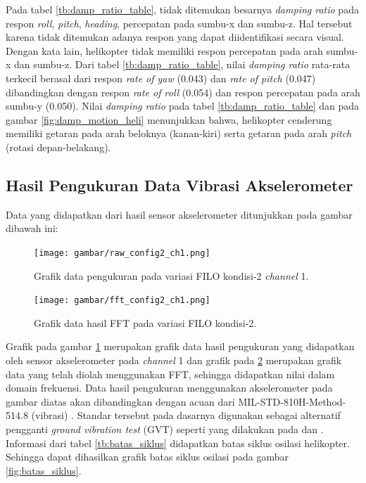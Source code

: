 Pada tabel \ref{tb:damp_ratio_table}, tidak ditemukan besarnya \textit{damping ratio} pada respon \textit{roll}, \textit{pitch}, \textit{heading}, percepatan pada sumbu-x dan sumbu-z. Hal tersebut karena tidak ditemukan adanya respon yang dapat diidentifikasi secara visual. Dengan kata lain, helikopter tidak memiliki respon percepatan pada arah sumbu-x dan sumbu-z. Dari tabel \ref{tb:damp_ratio_table}, nilai \textit{damping ratio} rata-rata terkecil berasal dari respon \textit{rate of yaw} (0.043) dan \textit{rate of pitch} (0.047) dibandingkan dengan respon \textit{rate of roll} (0.054) dan respon percepatan pada arah sumbu-y (0.050). Nilai \textit{damping ratio} pada tabel \ref{tb:damp_ratio_table} dan pada gambar \ref{fig:damp_motion_heli} menunjukkan bahwa, helikopter cenderung memiliki getaran pada arah beloknya (kanan-kiri) serta getaran pada arah \textit{pitch} (rotasi depan-belakang).

\subsection{Hasil Pengukuran Data Vibrasi Akselerometer}

Data yang didapatkan dari hasil sensor akselerometer ditunjukkan pada gambar dibawah ini:

\begin{figure}[h]
	\centering
	\texttt{[image: gambar/raw\_config2\_ch1.png]}
	\caption{Grafik data pengukuran pada variasi FILO kondisi-2 \textit{channel} 1.}
	\label{fig:raw_config2_FILO}
\end{figure}

\begin{figure}[H]
	\centering
	\texttt{[image: gambar/fft\_config2\_ch1.png]}
	\caption{Grafik data hasil FFT pada variasi FILO kondisi-2.}
	\label{fig:fft_config2_FILO}
\end{figure}

Grafik pada gambar \ref{fig:raw_config2_FILO} merupakan grafik data hasil pengukuran yang didapatkan oleh sensor akselerometer pada \textit{channel} 1 dan grafik pada \ref{fig:fft_config2_FILO} merupakan grafik data yang telah diolah menggunakan FFT, sehingga didapatkan nilai dalam domain frekuensi. Data hasil pengukuran menggunakan akselerometer pada gambar diatas akan dibandingkan dengan acuan dari MIL-STD-810H-Method-514.8 (vibrasi) \cite{MILSTD}. Standar tersebut pada dasarnya digunakan sebagai alternatif pengganti \textit{ground vibration test} (GVT) seperti yang dilakukan pada \cite{lubrina:hal-01059708} dan \cite{Ciavarella2018AnEH}. Informasi dari tabel \ref{tb:batas_siklus} didapatkan batas siklus osilasi helikopter. Sehingga dapat dihasilkan grafik batas siklus osilasi pada gambar \ref{fig:batas_siklus}. 

